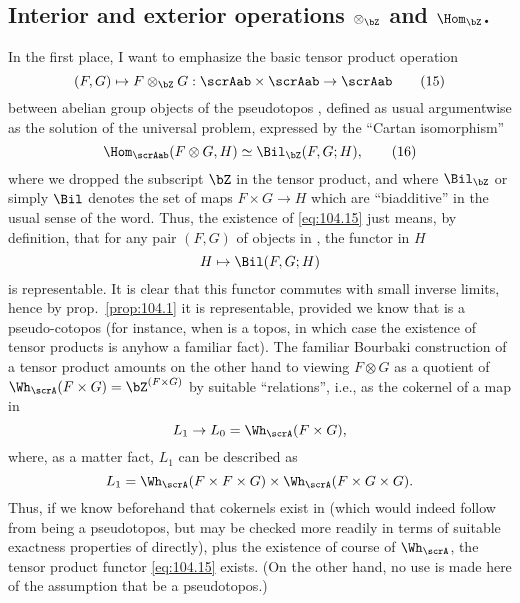 \subsection{Interior and exterior operations
  \texorpdfstring{$\otimes_{\bZ}$ and $\Hom_{\bZ}$}{tensorZ and
    HomZ}.}\label{subsec:104.C}
In the first place, I want to emphasize the basic tensor product
operation
\begin{equation}
  \label{eq:104.15}
  (F,G)\mapsto F\otimes_{\bZ} G : \scrAab\times\scrAab \to \scrAab\tag{15}
\end{equation}
between abelian group objects of the pseudotopos \scrA, defined as
usual argumentwise as the solution of the universal problem, expressed
by the ``Cartan isomorphism''
\begin{equation}
  \label{eq:104.16}
  \Hom_\scrAab(F\otimes G, H) \simeq \Bil_{\bZ}(F,G ; H),\tag{16}
\end{equation}
where we dropped the subscript $\bZ$ in the tensor product, and where
$\Bil_{\bZ}$ or simply $\Bil$ denotes the set of maps $F\times G\to H$
which are ``biadditive'' in the usual sense of the word. Thus, the
existence of \eqref{eq:104.15} just means, by definition,
that for any pair $(F,G)$ of objects in \scrAab, the functor in
$H$
\[H \mapsto \Bil(F,G;H)\]
is representable. It is clear that this functor commutes with small
inverse limits, hence by prop.\ \ref{prop:104.1} it is representable,
provided we know that \scrAab{} is a pseudo-cotopos (for instance,
when \scrA{} is a topos, in which case the existence of tensor
products is anyhow a familiar fact). The familiar Bourbaki
construction of a tensor product amounts on the other hand to viewing
$F\otimes G$ as a quotient of $\Wh_\scrA(F\times G)=\bZ^{(F\times G)}$ by
suitable ``relations'', i.e., as the cokernel of a map in
\scrAab
\[L_1\to L_0=\Wh_\scrA(F\times G),\]
where, as a matter fact, $L_1$ can be described as
\[L_1=\Wh_\scrA(F\times F\times G) \times \Wh_\scrA(F\times G\times
G).\]
Thus, if we know beforehand that cokernels exist in \scrAab{}
(which would indeed follow from \scrAab{} being a pseudotopos, but
may be checked more readily in terms of suitable exactness properties
of \scrA{} directly), plus the existence of course of $\Wh_\scrA$, the
tensor product functor \eqref{eq:104.15} exists. (On the other hand,
no use is made here of the assumption that \scrA{} be a pseudotopos.)

